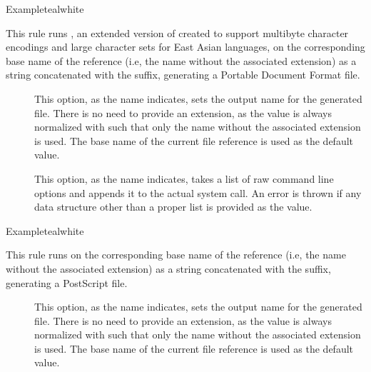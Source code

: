 \begin{description}
\begin{codebox}{Example}{teal}{\icnote}{white}
\end{codebox}

\item[\rulebox{dvipdfmx}]
This rule runs , an extended version of  created to support multibyte character encodings and large character sets for East Asian languages, on the corresponding base name of the  reference (i.e, the name without the associated extension) as a string concatenated with the  suffix, generating a Portable Document Format  file.

\begin{description}
\item[] This option, as the name indicates, sets the output name for the generated  file. There is no need to provide an extension, as the value is always normalized with  such that only the name without the associated extension is used. The base name of the current file reference is used as the default value.

\item[] This option, as the name indicates, takes a list of raw command line options and appends it to the actual system call. An error is thrown if any data structure other than a proper list is provided as the value.
\end{description}

\begin{codebox}{Example}{teal}{\icnote}{white}
\end{codebox}

\item[\rulebox{dvips}]
This rule runs  on the corresponding base name of the  reference (i.e, the name without the associated extension) as a string concatenated with the  suffix, generating a PostScript  file.

\begin{description}
\item[] This option, as the name indicates, sets the output name for the generated  file. There is no need to provide an extension, as the value is always normalized with  such that only the name without the associated extension is used. The base name of the current file reference is used as the default value.


\end{description}
\end{description}
